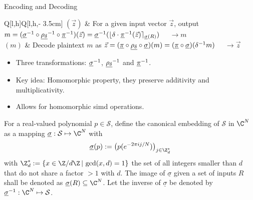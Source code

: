 \begin{frame}{Encoding and Decoding}
   \\
  \begin{tblr}{Q[l,h]Q[l,h,\textwidth - 3.5cm]}
    $(\vec{z})$ & {For a given input vector $\vec{z}$, output
        $m = (\underline{\sigma}^{-1} \circ \underline{\rho_\delta}^{-1} \circ \underline{\pi}^{-1})(\vec{z}) = \underline{\sigma}^{-1}(\lfloor \delta \cdot \underline{\pi}^{-1}(\vec{z})\rceil_{\underline{\sigma}(R)})$ $\quad\rightarrow m$} \\
    $(m)$ & {Decode plaintext $m$ as
        $\vec{z} = (\underline{\pi} \circ \underline{\rho_\delta} \circ \underline{\sigma})(m) = (\underline{\pi} \circ \underline{\sigma})(\delta^{-1} m)$
        $\quad\rightarrow \vec{z}$} \\
  \end{tblr}
  \begin{itemize}
    \item Three transformations: $\underline{\sigma}^{-1}$, $\underline{\rho_\delta}^{-1}$ and $\underline{\pi}^{-1}$.
    \item Key idea: Homomorphic property, they preserve additivity and multiplicativity.
    \item Allows for homomorphic \gls{simd} operations.
  \end{itemize}
\end{frame}

\begin{frame}[c]
  \begin{definition}
    For a real-valued polynomial $p \in \mathcal{S}$, define the canonical embedding of $\mathcal{S}$ in $\C^N$ as a mapping $\underline{\sigma}: \mathcal{S} \mapsto \C^N$ with $$\underline{\sigma}(p) := \big(p(e^{-2\pi i j / N})\big)_{j \in \Z_d^*}$$ with $\Z_d^* := \{x \in \Z / d\Z \,|\, \gcd(x, d) = 1\}$ the set of all integers smaller than $d$ that do not share a factor $> 1$ with $d$.
    The image of $\underline{\sigma}$ given a set of inputs $R$ shall be denoted as $\underline{\sigma}(R) \subseteq \C^N$.
    Let the inverse of $\underline{\sigma}$ be denoted by $\underline{\sigma}\inv: \C^N \mapsto \mathcal{S}$.
  \end{definition}
\end{frame}

